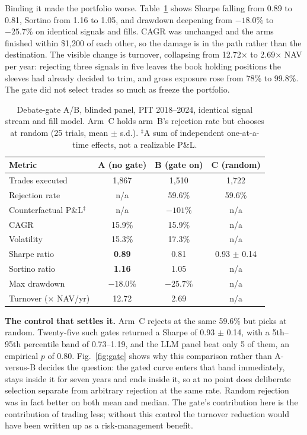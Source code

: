 \documentclass[conference]{IEEEtran}
\begin{document}
Binding it made the portfolio worse. Table~\ref{tab:abtest} shows Sharpe
falling from 0.89 to 0.81, Sortino from 1.16 to 1.05, and drawdown deepening
from $-18.0\%$ to $-25.7\%$ on identical signals and fills. CAGR was unchanged
and the arms finished within \$1{,}200 of each other, so the damage is in the
path rather than the destination. The visible change is turnover, collapsing
from 12.72$\times$ to 2.69$\times$ NAV per year: rejecting three signals in
five leaves the book holding positions the sleeves had already decided to trim,
and gross exposure rose from 78\% to 99.8\%. The gate did not select trades so
much as freeze the portfolio.

\begin{table}[!tb]
\caption{Debate-gate A/B, blinded panel, PIT 2018--2024, identical signal
stream and fill model. Arm~C holds arm~B's rejection rate but chooses at random
(25 trials, mean $\pm$ s.d.). $^\ddagger$A sum of independent one-at-a-time
effects, not a realizable P\&L.}
\label{tab:abtest}
\centering
\setlength{\tabcolsep}{4pt}
\footnotesize
\begin{tabular}{lccc}
\toprule
Metric & A (no gate) & B (gate on) & C (random) \\
\midrule
Trades executed & 1{,}867 & 1{,}510 & 1{,}722 \\
Rejection rate & n/a & 59.6\% & 59.6\% \\
Counterfactual P\&L$^\ddagger$ & n/a & $-101\%$ & n/a \\
CAGR & 15.9\% & 15.9\% & n/a \\
Volatility & 15.3\% & 17.3\% & n/a \\
Sharpe ratio & \textbf{0.89} & 0.81 & 0.93 $\pm$ 0.14 \\
Sortino ratio & \textbf{1.16} & 1.05 & n/a \\
Max drawdown & $\mathbf{-18.0\%}$ & $-25.7\%$ & n/a \\
Turnover ($\times$ NAV/yr) & 12.72 & 2.69 & n/a \\
\bottomrule
\end{tabular}
\end{table}

\textbf{The control that settles it.} Arm~C rejects at the same 59.6\% but
picks at random. Twenty-five such gates returned a Sharpe of 0.93 $\pm$ 0.14,
with a 5th--95th percentile band of 0.73--1.19, and the LLM panel beat only 5
of them, an empirical $p$ of 0.80. Fig.~\ref{fig:gate} shows why this
comparison rather than A-versus-B decides the question: the gated curve enters
that band immediately, stays inside it for seven years and ends inside it, so
at no point does deliberate selection separate from arbitrary rejection at the
same rate. Random rejection was in fact better on both mean and median. The
gate's contribution here is the contribution of trading less; without this
control the turnover reduction would have been written up as a risk-management
benefit.
\end{document}
